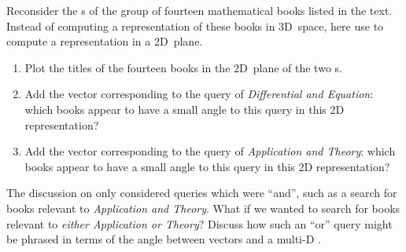 \begin{exercise} \label{ex:} 
Reconsider the s of the group of fourteen mathematical books listed in the text. 
Instead of computing a representation of these books in 3D~space, here use  to compute a representation in a 2D~plane.
\begin{enumerate}
\item Plot the titles of the fourteen books in the 2D~plane of the two s.

\item Add the vector corresponding to the query of \emph{Differential and Equation}: which books appear to have a small angle to this query in this 2D representation?


\item Add the vector corresponding to the query of \emph{Application and Theory}: which books appear to have a small angle to this query in this 2D representation?

\end{enumerate}
\end{exercise}




\begin{exercise} \label{ex:} 
The discussion on  only considered queries which were ``and'', such as a search for books relevant to \emph{Application and Theory}.
What if we wanted to search for books relevant to \emph{either Application or Theory}?
Discuss how such an ``or'' query might be phrased in terms of the angle between vectors and a multi-D .
\end{exercise}




